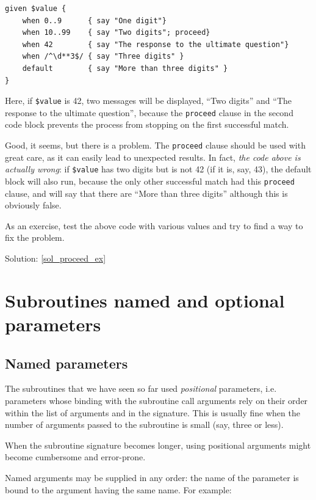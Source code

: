 \begin{verbatim}
given $value {
    when 0..9      { say "One digit"}
    when 10..99    { say "Two digits"; proceed}
    when 42        { say "The response to the ultimate question"}
    when /^\d**3$/ { say "Three digits" }
    default        { say "More than three digits" }
}
\end{verbatim}

Here, if \verb'$value' is 42, two messages will be displayed,  
``Two digits'' and ``The response to the ultimate question'', 
because the {\tt proceed} clause in the second code block 
prevents the process from stopping on the first successful match.

Good, it seems, but there is a problem. The {\tt proceed} clause 
should be used with great care, as it can easily lead 
to unexpected results. In fact, \emph{the code above 
is actually wrong}: if \verb'$value' has two digits but is 
not 42 (if it is, say, 43), the default block will also run, 
because the only other successful match had this {\tt proceed} 
clause, and will say that there are ``More than three digits'' 
although this is obviously false. 

\label{proceed_ex}
As an exercise, test the above code with various values and 
try to find a way to fix the problem.

Solution: \ref{sol_proceed_ex}

\section{Subroutines named and optional parameters}

\subsection{Named parameters}

The subroutines that we have seen so far used \emph{positional} 
parameters, i.e. parameters whose binding with the subroutine 
call arguments rely on their order within the list of 
arguments and in the signature. This is usually fine when 
the number of arguments passed to the subroutine is small 
(say, three or less). 

When the subroutine signature becomes longer, using positional 
arguments might become cumbersome and error-prone.

Named arguments may be supplied in any order: the name of 
the parameter is bound to the argument having the same 
name. For example:

